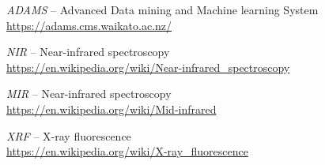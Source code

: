 %

\begin{thebibliography}{999}

    \textit{ADAMS} -- Advanced Data mining and Machine learning System \\
    \url{https://adams.cms.waikato.ac.nz/}{}

    \textit{NIR} -- Near-infrared spectroscopy \\
    \url{https://en.wikipedia.org/wiki/Near-infrared_spectroscopy}{}

    \textit{MIR} -- Near-infrared spectroscopy \\
    \url{https://en.wikipedia.org/wiki/Mid-infrared}{}

    \textit{XRF} -- X-ray fluorescence \\
    \url{https://en.wikipedia.org/wiki/X-ray_fluorescence}{}

\end{thebibliography}
